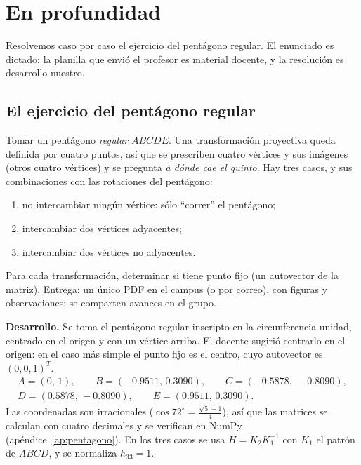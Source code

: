 \section{En profundidad}

Resolvemos caso por caso el ejercicio del pentágono regular. El enunciado es dictado; la planilla que envió el profesor es material docente, y la resolución es desarrollo nuestro.

\subsection{El ejercicio del pentágono regular}

\begin{enunciado}
Tomar un pentágono \emph{regular} \(ABCDE\). Una transformación proyectiva queda definida
por cuatro puntos, así que se prescriben cuatro vértices y sus imágenes (otros cuatro
vértices) y se pregunta \emph{a dónde cae el quinto}. Hay tres casos, y sus combinaciones
con las rotaciones del pentágono:
\begin{enumerate}[label=(\alph*)]
  \item no intercambiar ningún vértice: sólo ``correr'' el pentágono;
  \item intercambiar dos vértices adyacentes;
  \item intercambiar dos vértices no adyacentes.
\end{enumerate}
Para cada transformación, determinar si tiene punto fijo (un autovector de la matriz).
Entrega: un único PDF en el campus (o por correo), con figuras y observaciones; se
comparten avances en el grupo.
\end{enunciado}

\textbf{Desarrollo.} Se toma el pentágono regular inscripto en la circunferencia unidad,
centrado en el origen y con un vértice arriba. El docente sugirió centrarlo en el origen:
en el caso más simple el punto fijo es el centro, cuyo autovector es \((0,0,1)^T\).
\begin{gather*}
  A=(0,\,1),\qquad B=(-0.9511,\,0.3090),\qquad C=(-0.5878,\,-0.8090),\\
  D=(0.5878,\,-0.8090),\qquad E=(0.9511,\,0.3090).
\end{gather*}
Las coordenadas son irracionales (\(\cos72^\circ=\frac{\sqrt5-1}{4}\)), así que las
matrices se calculan con cuatro decimales y se verifican en NumPy (apéndice~\ref{ap:pentagono}).
En los tres casos se usa \(H=K_2K_1^{-1}\) con \(K_1\) el patrón de \(ABCD\), y se
normaliza \(h_{33}=1\).

